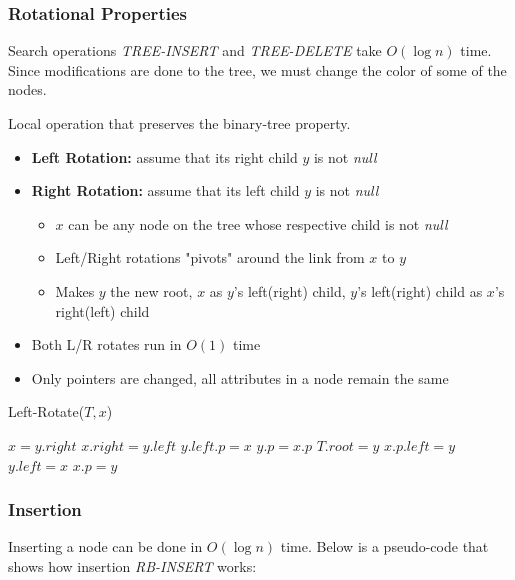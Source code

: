\documentclass[10pt, 
a4paper, 
oneside, 
headinclude, footinclude, 
BCOR5mm]
{scrartcl}
\begin{document}
\newpage
\subsubsection{Rotational Properties}
Search operations \textit{TREE-INSERT} and \textit{TREE-DELETE} take $O(\log n)$ time. Since modifications are done to the tree, we must change the color of some of the nodes.
\begin{definition}
    Local operation that preserves the binary-tree property. 
    \begin{itemize}
        \item \textbf{Left Rotation:} assume that its right child $y$ is not \textit{null} 
        \item \textbf{Right Rotation:} assume that its left child $y$ is not \textit{null}
        \begin{itemize}
            \item $x$ can be any node on the tree whose respective child is not \textit{null}
            \item Left/Right rotations "pivots" around the link from $x$ to $y$
            \item Makes $y$ the new root, $x$ as $y$'s left(right) child, $y$'s left(right) child as $x$'s right(left) child
        \end{itemize}
        \item Both L/R rotates run in $O(1)$ time
        \item Only pointers are changed, all attributes in a node remain the same
    \end{itemize}
\end{definition}

\begin{algorithm}
    \caption{Left-Rotate($T,x$)}

    $x = y.right$ 
    $x.right = y.left$ 
        {$y.left.p = x$\;}
    $y.p = x.p$\;
        {$T.root = y$\;}
        {$x.p.left = y$\;}
    $y.left = x$\;
    $x.p = y$\;
\end{algorithm}

\newpage 
\subsubsection{Insertion}
Inserting a node can be done in $O(\log n)$ time. Below is a pseudo-code that shows how insertion \textit{RB-INSERT} works:
\end{document}
